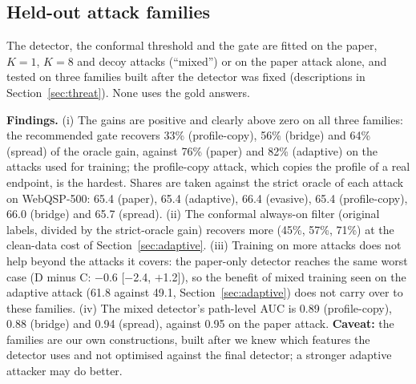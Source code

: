 \documentclass[preprint,12pt]{elsarticle}
\begin{document}
\subsection{Held-out attack families}\label{sec:heldout}
The detector, the conformal threshold and the gate are fitted on the paper, $K=1$, $K=8$ and decoy attacks (``mixed'') or on the paper attack alone, and tested on three families built after the detector was fixed (descriptions in Section~\ref{sec:threat}). None uses the gold answers.
\begin{table}[tbp]
\centering\footnotesize
{}
\caption{F1 on three held-out attack families (oracle and gate rows use strict labels; the always-on row keeps the original labelling), with the paired gain over no defence in brackets; paired bootstrap over questions, minimum over families inside each resample.}
\end{table}
\textbf{Findings.} (i) The gains are positive and clearly above zero on all three families: the recommended gate recovers 33\% (profile-copy), 56\% (bridge) and 64\% (spread) of the oracle gain, against 76\% (paper) and 82\% (adaptive) on the attacks used for training; the profile-copy attack, which copies the profile of a real endpoint, is the hardest. Shares are taken against the strict oracle of each attack on WebQSP-500: 65.4 (paper), 65.4 (adaptive), 66.4 (evasive), 65.4 (profile-copy), 66.0 (bridge) and 65.7 (spread). (ii) The conformal always-on filter (original labels, divided by the strict-oracle gain) recovers more (45\%, 57\%, 71\%) at the clean-data cost of Section~\ref{sec:adaptive}. (iii) Training on more attacks does not help beyond the attacks it covers: the paper-only detector reaches the same worst case (D minus C: $-$0.6 [$-$2.4, $+$1.2]), so the benefit of mixed training seen on the adaptive attack (61.8 against 49.1, Section~\ref{sec:adaptive}) does not carry over to these families. (iv) The mixed detector's path-level AUC is 0.89 (profile-copy), 0.88 (bridge) and 0.94 (spread), against 0.95 on the paper attack. \textbf{Caveat:} the families are our own constructions, built after we knew which features the detector uses and not optimised against the final detector; a stronger adaptive attacker may do better.
\end{document}
